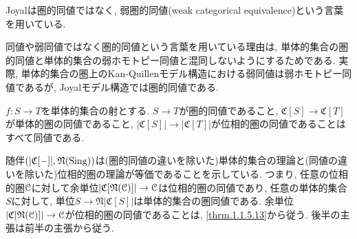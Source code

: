 \documentclass[uplatex, a4paper, 14Q, dvipdfmx]{jsreport}
\begin{document}
\begin{remark} \label{rem.1.1.5.15}
  Joyalは圏的同値ではなく, 弱圏的同値(weak categorical equivalence)という言葉を用いている. 
\end{remark}

\begin{remark} \label{rem.1.1.5.16}
  同値や弱同値ではなく圏的同値という言葉を用いている理由は, 単体的集合の圏的同値と単体的集合の弱ホモトピー同値と混同しないようにするためである.
  実際, 単体的集合の圏上のKan-Quillenモデル構造における弱同値は弱ホモトピー同値であるが, Joyalモデル構造では圏的同値である.
\end{remark}

\begin{remark} \label{rem.1.1.5.17}
  $f : S \to T$を単体的集合の射とする. 
  $S \to T$が圏的同値であること, $\mathfrak{C}[S] \to \mathfrak{C}[T]$が単体的圏の同値であること, $|\mathfrak{C}[S]| \to |\mathfrak{C}[T]|$が位相的圏の同値であることはすべて同値である. 
\end{remark}

\begin{remark} \label{rem.1.1.5.18}
  随伴$(|\mathfrak{C}[-]|, \mathfrak{N}(\mathrm{Sing}))$は(圏的同値の違いを除いた)単体的集合の理論と(同値の違いを除いた)位相的圏の理論が等価であることを示している. 
  つまり, 任意の位相的圏$\mathcal{C}$に対して余単位$|\mathfrak{C}[\mathfrak{N}(\mathcal{C})]| \to \mathcal{C}$は位相的圏の同値であり, 任意の単体的集合$S$に対して, 単位$S \to \mathfrak{N}|\mathfrak{C}[S]|$は単体的集合の圏同値である.
  余単位$|\mathfrak{C}[\mathfrak{N}(\mathcal{C})]| \to \mathcal{C}$が位相的圏の同値であることは, \cref{thrm.1.1.5.13}から従う. 
  後半の主張は前半の主張から従う. 
\end{remark}
\end{document}
